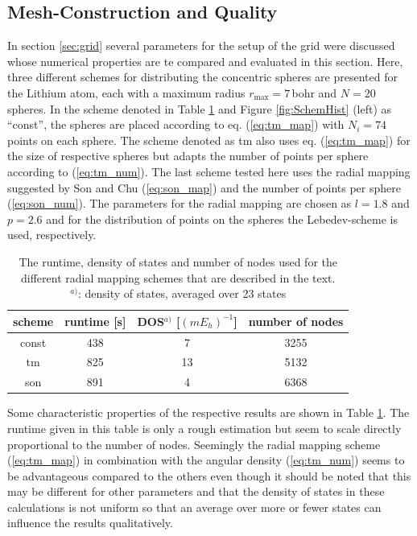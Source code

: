 \subsection{Mesh-Construction and Quality}
\label{sec:NumConve}
In section \ref{sec:grid} several parameters for the setup of the grid were discussed whose numerical properties are te compared and evaluated in this section.
Here, three different schemes for distributing the concentric spheres are presented for the Lithium atom, each with a maximum radius $r_\text{max}=7\,$bohr and $N=20$ spheres.
In the scheme denoted in Table \ref{tab:RadScheme} and Figure \ref{fig:SchemHist} (left) as ``const'', the spheres are placed according to eq. (\ref{eq:tm_map}) with $N_i=74$ points on each sphere.
The scheme denoted as tm also uses eq. (\ref{eq:tm_map}) for the size of respective spheres but adapts the number of points per sphere according to (\ref{eq:tm_num}).
The last scheme tested here uses the radial mapping suggested by Son and Chu \cite{Son_Chu0} (\ref{eq:son_map}) and the number of points per sphere (\ref{eq:son_num}).
The parameters for the radial mapping are chosen as $l=1.8$ and $p=2.6$ and for the distribution of points on the spheres the Lebedev-scheme \cite{lebedev} is used, respectively.
\begin{table}
\begin{tabular}{|c|c|c|c|}
\hline
scheme & runtime [s] & DOS$^{a)}$ [$(m E_h)^{-1}$] & number of nodes\\
\hline
const   &  438   &    7    &   3255 \\
tm      &  825   &    13   &   5132 \\
son     &  891   &    4    &   6368 \\
\hline
\end{tabular}
\caption{The runtime, density of states and number of nodes used for the different radial mapping schemes that are described in the text.\\
$^{a)}$: density of states, averaged over 23 states}
\label{tab:RadScheme}
\end{table}
Some characteristic properties of the respective results are shown in Table \ref{tab:RadScheme}.
The runtime given in this table is only a rough estimation but seem to scale directly proportional to the number of nodes.
Seemingly the radial mapping scheme (\ref{eq:tm_map}) in combination with the angular density (\ref{eq:tm_num}) seems to be advantageous compared to the others even though it should be noted that this may be different for other parameters and that the density of states in these calculations is not uniform so that an average over more or fewer states can influence the results qualitatively.
